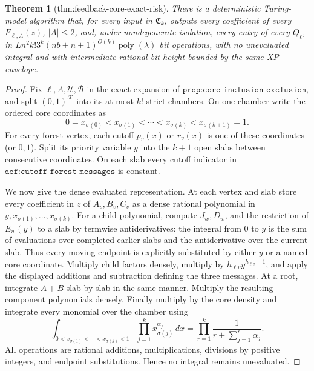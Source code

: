 \documentclass{article}
\newtheorem{theorem}{Theorem}
\begin{document}
\begin{theorem}[thm:feedback-core-exact-risk]\label{thm:feedback-core-exact-risk}
There is a deterministic Turing-model algorithm that, for every input in \(\mathfrak C_k\), outputs every coefficient of every \(F_{\ell,A}(z)\), \(|A|\le2\), and, under nondegenerate isolation, every entry of every \(Q_\ell\), in \(Ln^2k!3^k(nb+n+1)^{O(k)}\operatorname{poly}(\lambda)\) bit operations, with no unevaluated integral and with intermediate rational bit height bounded by the same XP envelope.
\end{theorem}
\begin{proof}
Fix \(\ell,A,\mathcal U,\mathcal B\) in the exact expansion of \(\texttt{prop:core-inclusion-exclusion}\), and split \((0,1)^{\mathcal K}\) into its at most \(k!\) strict chambers.  On one chamber write the ordered core coordinates as
\[
 0=x_{\sigma(0)}<x_{\sigma(1)}<\cdots<x_{\sigma(k)}<x_{\sigma(k+1)}=1.
\]
For every forest vertex, each cutoff \(p_v(x)\) or \(r_v(x)\) is one of these coordinates (or \(0,1\)).  Split its priority variable \(y\) into the \(k+1\) open slabs between consecutive coordinates.  On each slab every cutoff indicator in \(\texttt{def:cutoff-forest-messages}\) is constant.

We now give the dense evaluated representation.  At each vertex and slab store every coefficient in \(z\) of \(A_v,B_v,C_v\) as a dense rational polynomial in \(y,x_{\sigma(1)},\ldots,x_{\sigma(k)}\).  For a child polynomial, compute \(J_w,D_w\), and the restriction of \(E_w(y)\) to a slab by termwise antiderivatives: the integral from \(0\) to \(y\) is the sum of evaluations over completed earlier slabs and the antiderivative over the current slab.  Thus every moving endpoint is explicitly substituted by either \(y\) or a named core coordinate.  Multiply child factors densely, multiply by \(h_{\ell v}y^{h_{\ell v}-1}\), and apply the displayed additions and subtraction defining the three messages.  At a root, integrate \(A+B\) slab by slab in the same manner.  Multiply the resulting component polynomials densely.  Finally multiply by the core density and integrate every monomial over the chamber using
\[
 \int_{0<x_{\sigma(1)}<\cdots<x_{\sigma(k)}<1}
    \prod_{j=1}^kx_{\sigma(j)}^{\alpha_j}\,dx
 =\prod_{r=1}^k\frac{1}{r+\sum_{j=1}^r\alpha_j}.
\]
All operations are rational additions, multiplications, divisions by positive integers, and endpoint substitutions.  Hence no integral remains unevaluated.


\end{proof}
\end{document}

